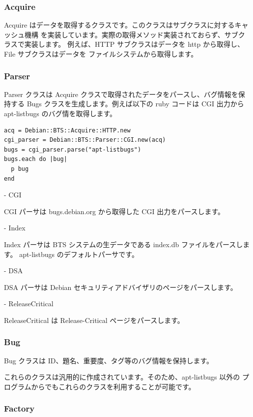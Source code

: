 \documentclass[mingoth,a4paper]{jsarticle}
\begin{document}
\subsubsection{Acquire}

Acquire はデータを取得するクラスです。このクラスはサブクラスに対するキャッシュ機構
を実装しています。実際の取得メソッド実装されておらず、サブクラスで実装します。
例えば、HTTP サブクラスはデータを http から取得し、File サブクラスはデータを
ファイルシステムから取得します。

\subsubsection{Parser}

Parser クラスは Acquire クラスで取得されたデータをパースし、バグ情報を保持する
Bugs クラスを生成します。例えば以下の ruby コードは CGI 出力から apt-listbugs
のバグ情を取得します。

\begin{verbatim}
acq = Debian::BTS::Acquire::HTTP.new
cgi_parser = Debian::BTS::Parser::CGI.new(acq)
bugs = cgi_parser.parse("apt-listbugs")
bugs.each do |bug|
  p bug
end
\end{verbatim}

- CGI

 CGI パーサは bugs.debian.org から取得した CGI 出力をパースします。

- Index

 Index パーサは BTS システムの生データである index.db ファイルをパースします。
 apt-listbugs のデフォルトパーサです。

- DSA

 DSA パーサは Debian セキュリティアドバイザリのページをパースします。

- ReleaseCritical

 ReleaseCritical は Release-Critical ページをパースします。

\subsubsection{Bug}

 Bug クラスは ID、題名、重要度、タグ等のバグ情報を保持します。

これらのクラスは汎用的に作成されています。そのため、apt-listbugs 以外の
プログラムからでもこれらのクラスを利用することが可能です。

\subsubsection{Factory}
\end{document}
